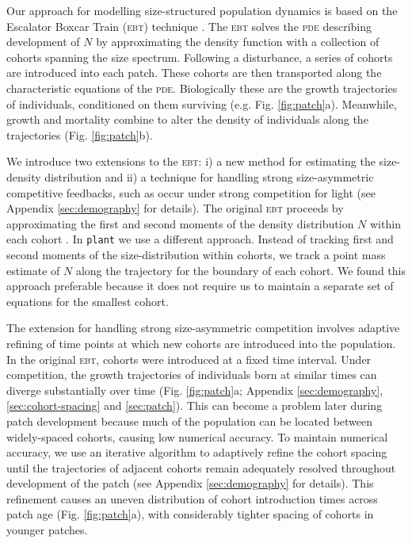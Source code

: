 \documentclass[a4paper,11pt]{article}
\newcommand{\plant}{\texttt{plant}}
\begin{document}
Our approach for modelling size-structured population dynamics is
based on the Escalator Boxcar Train (\textsc{ebt}) technique
\citep{Deroos-1988, Deroos-1992, Deroos-1997}. The \textsc{ebt} solves
the \textsc{pde} describing development of \(N\) by approximating the
density function with a collection of cohorts spanning the size
spectrum. Following a disturbance, a series of cohorts are introduced
into each patch. These cohorts are then transported along the
characteristic equations of the \textsc{pde}. Biologically these are
the growth trajectories of individuals, conditioned on them surviving
(e.g. Fig. \ref{fig:patch}a). Meanwhile, growth and mortality combine
to alter the density of individuals along the trajectories
(Fig. \ref{fig:patch}b).

We introduce two extensions to the \textsc{ebt}: i) a new method for
estimating the size-density distribution and ii) a technique for
handling strong size-asymmetric competitive feedbacks, such as occur
under strong competition for light (see Appendix \ref{sec:demography}
for details). The original \textsc{ebt} proceeds by approximating the
first and second moments of the density distribution \(N\) within each
cohort \citep{Deroos-1997}.
%
In {\plant} we use a different approach. Instead of tracking first and
second moments of the size-distribution within cohorts, we track a
point mass estimate of \(N\) along the trajectory for the boundary of
each cohort. We found this approach preferable because it does not
require us to maintain a separate set of equations for the smallest
cohort.

The extension for handling strong size-asymmetric competition involves
adaptive refining of time points at which new cohorts are introduced
into the population. In the original \textsc{ebt}, cohorts were
introduced at a fixed time interval. Under competition, the growth
trajectories of individuals born at similar times can diverge
substantially over time (Fig. \ref{fig:patch}a; Appendix
\ref{sec:demography}, \ref{sec:cohort-spacing} and
\ref{sec:patch}). This can become a problem later during patch
development because much of the population can be located between
widely-spaced cohorts, causing low numerical accuracy. To maintain
numerical accuracy, we use an iterative algorithm to adaptively refine
the cohort spacing until the trajectories of adjacent cohorts remain
adequately resolved throughout development of the patch (see Appendix
\ref{sec:demography} for details). This refinement causes an uneven
distribution of cohort introduction times across patch age (Fig.
\ref{fig:patch}a), with considerably tighter spacing of cohorts in
younger patches.
\end{document}
